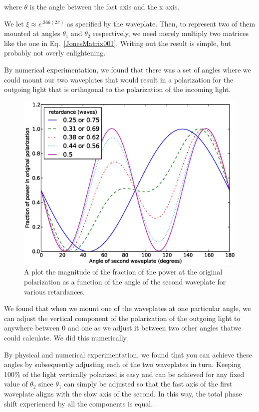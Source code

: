 where $\theta$ is the angle between the fast axis and the x axis. 

We let $\xi\approx e^{.366 (2 \pi)}$ as specified by the waveplate. Then, to represent two of them mounted at angles $\theta_1$ and $\theta_2$ respectively, we need merely multiply two matrices like the one in Eq.\ \ref{JonesMatrix001}. Writing out the result is simple, but probably not overly enlightening. 

By numerical experimentation, we found that there was a set of angles where we could mount our two waveplates that would result in a polarization for the outgoing light that is orthogonal to the polarization of the incoming light. 

\begin{figure}
    \centerline{\includegraphics{NewNotesSymmetricFig}}
    \caption[Numerical method]{\label{fig:numericalLightControlMethod}
    A plot the magnitude of the fraction of the power at the original polarization as a function of the angle of the second waveplate for various retardances.}
\end{figure}

We found that when we mount one of the waveplates at one particular angle, we can adjust the vertical component of the polarization of the outgoing light to anywhere between 0 and one as we adjust it between two other angles thatwe could calculate. We did this numerically. 

By physical and numerical experimentation, we found that you can achieve these angles by subsequently adjusting each of the two waveplates in turn. Keeping 100\% of the light vertically polarized is easy and can be achieved for any fixed value of $\theta_2$ since $\theta_1$ can simply be adjusted so that the fast axis of the first waveplate aligns with the slow axis of the second. In this way, the total phase shift experienced by all the components is equal.

